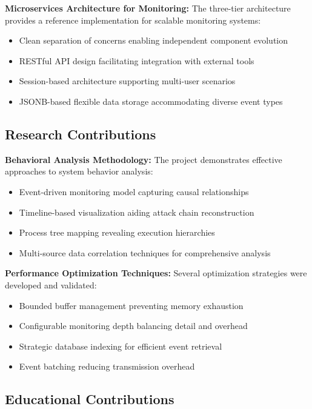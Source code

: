 \textbf{Microservices Architecture for Monitoring:}
The three-tier architecture provides a reference implementation for scalable monitoring systems:
\begin{itemize}
    \item Clean separation of concerns enabling independent component evolution
    \item RESTful API design facilitating integration with external tools
    \item Session-based architecture supporting multi-user scenarios
    \item JSONB-based flexible data storage accommodating diverse event types
\end{itemize}

\subsection{Research Contributions}

\textbf{Behavioral Analysis Methodology:}
The project demonstrates effective approaches to system behavior analysis:
\begin{itemize}
    \item Event-driven monitoring model capturing causal relationships
    \item Timeline-based visualization aiding attack chain reconstruction
    \item Process tree mapping revealing execution hierarchies
    \item Multi-source data correlation techniques for comprehensive analysis
\end{itemize}

\textbf{Performance Optimization Techniques:}
Several optimization strategies were developed and validated:
\begin{itemize}
    \item Bounded buffer management preventing memory exhaustion
    \item Configurable monitoring depth balancing detail and overhead
    \item Strategic database indexing for efficient event retrieval
    \item Event batching reducing transmission overhead
\end{itemize}

\subsection{Educational Contributions}


